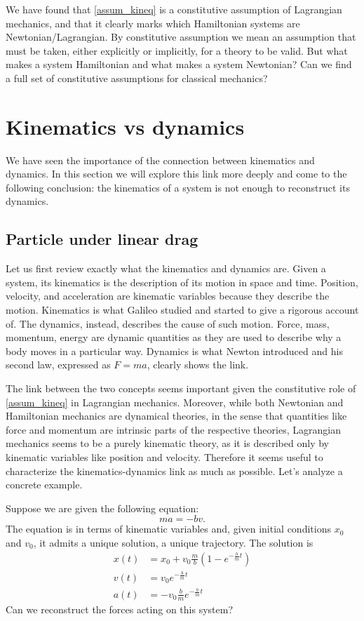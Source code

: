 We have found that \ref{assum_kineq} is a constitutive assumption of Lagrangian mechanics, and that it clearly marks which Hamiltonian systems are Newtonian/Lagrangian. By constitutive assumption we mean an assumption that must be taken, either explicitly or implicitly, for a theory to be valid. But what makes a system Hamiltonian and what makes a system Newtonian? Can we find a full set of constitutive assumptions for classical mechanics?

\section{Kinematics vs dynamics}

We have seen the importance of the connection between kinematics and dynamics. In this section we will explore this link more deeply and come to the following conclusion: the kinematics of a system is not enough to reconstruct its dynamics. 

\subsection{Particle under linear drag}

Let us first review exactly what the kinematics and dynamics are. Given a system, its kinematics is the description of its motion in space and time. Position, velocity, and acceleration are kinematic variables because they describe the motion. Kinematics is what Galileo studied and started to give a rigorous account of. The dynamics, instead, describes the cause of such motion. Force, mass, momentum, energy are dynamic quantities as they are used to describe why a body moves in a particular way. Dynamics is what Newton introduced and his second law, expressed as $F=ma$, clearly shows the link.

The link between the two concepts seems important given the constitutive role of \ref{assum_kineq} in Lagrangian mechanics. Moreover, while both Newtonian and Hamiltonian mechanics are dynamical theories, in the sense that quantities like force and momentum are intrinsic parts of the respective theories, Lagrangian mechanics seems to be a purely kinematic theory, as it is described only by kinematic variables like position and velocity. Therefore it seems useful to characterize the kinematics-dynamics link as much as possible. Let's analyze a concrete example.

Suppose we are given the following equation:
\begin{equation}\label{rp-cm-frictionEquation}
	m a = - b v .
\end{equation}
The equation is in terms of kinematic variables and, given initial conditions $x_0$ and $v_0$, it admits a unique solution, a unique trajectory.
The solution is
\begin{equation}
	\begin{aligned}
	x(t)&= x_0 + v_0 \frac{m}{b} \left( 1 - e^{-\frac{b}{m}t}\right) \\
	v(t)&= v_0 e^{-\frac{b}{m}t} \\
	a(t)&= - v_0 \frac{b}{m} e^{-\frac{b}{m}t}
	\end{aligned}
\end{equation}
Can we reconstruct the forces acting on this system?

